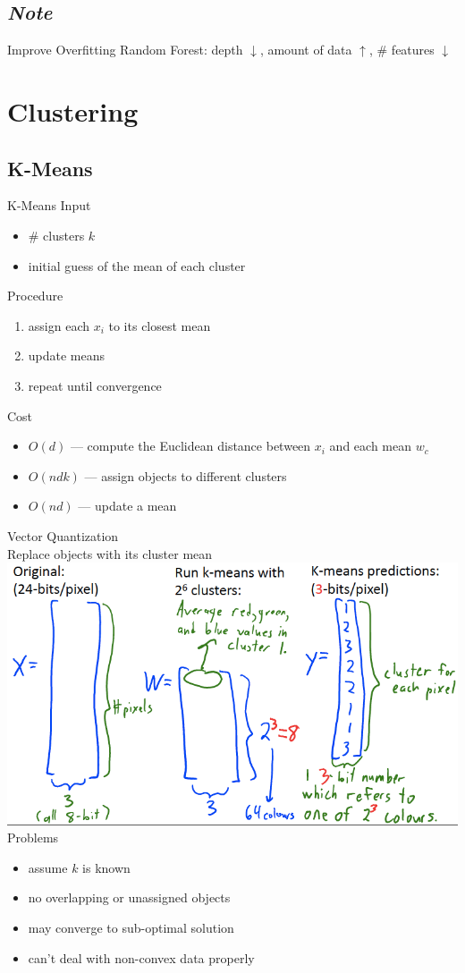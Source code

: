 \documentclass[10pt,landscape,a4paper]{article}
\begin{document}
\begin{multicols*}{5}
\subsection{\emph{Note}}
Improve Overfitting Random Forest: depth \(\downarrow \), amount of data \(\uparrow \), \# features \(\downarrow \)

\section{Clustering}

\subsection{K-Means}
K-Means Input
\begin{itemize}
    \item \# clusters \(k\)
    \item initial guess of the mean of each cluster
\end{itemize}
Procedure
\begin{enumerate}
    \item assign each \(x_i\) to its closest mean
    \item update means
    \item repeat until convergence
\end{enumerate}
Cost
\begin{itemize}
    \item \(O(d)\) --- compute the Euclidean distance between \(x_i\) and each mean \(w_c\)
    \item \(O(ndk)\) --- assign objects to different clusters
    \item \(O(nd)\) --- update a mean
\end{itemize}
Vector Quantization \\
Replace objects with its cluster mean \\
\includegraphics[scale=0.2]{vector_quantization}
Problems
\begin{itemize}
    \item assume \(k\) is known
    \item no overlapping or unassigned objects
    \item may converge to sub-optimal solution
    \item can't deal with non-convex data properly
\end{itemize}


\end{multicols*}
\end{document}
